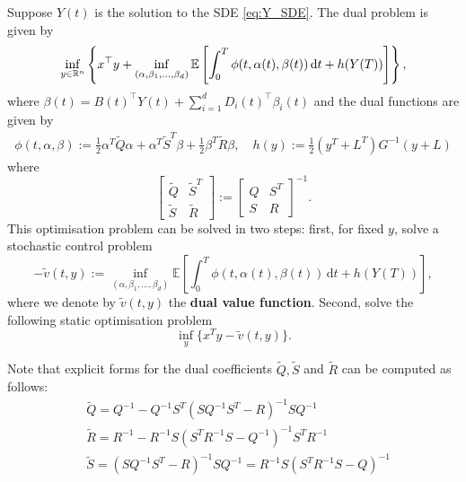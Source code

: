 \begin{definition}
\label{definition: dual_problem}
    Suppose $Y(t)$ is the solution to the SDE \eqref{eq:Y_SDE}. The dual problem is given by
    \[
    \inf_{y \in \mathbb{R}^n} \left\{ x^\top y + \inf_{(\alpha, \beta_1, \dots, \beta_d)} \mathbb{E} \left[ \int_{0}^T \phi(t, \alpha(t), \beta(t)) \, \mathrm{d}t + h(Y(T)) \right] \right\},
    \]
    where \( \beta(t) = B(t)^\top Y(t) + \sum_{i=1}^d D_i(t)^\top \beta_i(t) \) and the dual functions are given by
    \begin{align*}
        \phi(t, \alpha, \beta) := \frac12 \alpha^T \tilde{Q} \alpha + \alpha^T \tilde{S}^T \beta + \frac12 \beta^T \tilde{R} \beta, \quad
        h(y) := \frac12 (y^T + L^T ) G^{-1} (y + L)
    \end{align*}
    where
    \begin{equation*} 
        \begin{bmatrix}
            \tilde{Q} & \tilde{S}^T\\
            \tilde{S} & \tilde{R}
        \end{bmatrix}
        :=
        \begin{bmatrix}
            Q & S^T\\
            S & R
        \end{bmatrix}^{-1}.
    \end{equation*}
    This optimisation problem can be solved in two steps: first, for fixed \( y \), solve a stochastic control problem
    \begin{equation*}
        - \tilde{v}(t, y) := \inf_{(\alpha, \beta_1, \dots, \beta_d)} \mathbb{E} \left[ \int_{0}^T \phi(t, \alpha(t), \beta(t)) \, \mathrm{d}t + h(Y(T)) \right],
    \end{equation*}
    where we denote by $\tilde{v}(t,y)$ the \textbf{dual value function}. Second, solve the following static optimisation problem 
    \begin{equation*}
        \inf_{y} \{ x^T y - \tilde{v}(t, y) \}.
    \end{equation*}
\end{definition}


\begin{remark}
    Note that explicit forms for the dual coefficients $\tilde{Q}, \tilde{S}$ and $\tilde{R}$ can be computed as follows:
    \begin{align*}
    &\tilde{Q} = Q^{-1} - Q^{-1} S^T (S Q^{-1} S^T - R)^{-1}S Q^{-1} \\
    &\tilde{R} = R^{-1} - R^{-1} S (S^T R^{-1}S - Q^{-1})^{-1}S^T R^{-1} \\
    &\tilde{S} = (S Q^{-1} S^T - R)^{-1}S Q^{-1} = R^{-1}S(S^TR^{-1}S - Q)^{-1}
    \end{align*}
\end{remark}


